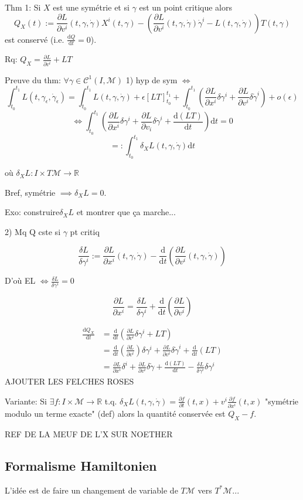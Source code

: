 \documentclass[a4paper,11pt]{article}
\renewcommand{\d}{{\mathrm{d}}}
\newcommand{\dr}[2]{\frac{\partial {#1}}{\partial{#2}}}
\begin{document}
Thm 1: Si $X$ est une symétrie et si $\gamma$ est un point critique alors
$$Q_X(t) := \dr{L}{v^i}(t,\gamma,\dot\gamma)X^i(t,\gamma) - \left(\dr{L}{v^i}(t,\gamma,\dot\gamma)\dot\gamma^i - L(t,\gamma,\dot\gamma)\right)T(t,\gamma)$$
est conservé (i.e. $\frac{\d Q}{\d t}=0$).

Rq: $Q_X = \dr{L}{v^i} + LT$

Preuve du thm:
$\forall \gamma \in \mathcal{C}^1(I,\mathcal{M})$
1) hyp de sym $\iff$
$$\int_{t_0}^{t_1} L(t,\gamma_\epsilon,\dot\gamma_\epsilon) = \int_{t_0}^{t_1}L(t,\gamma,\dot\gamma) + \epsilon [LT]_{t_0}^{t_1} + \int_{t_0}^{t_1} (\dr{L}{x^i}\delta \gamma^i + \dr{L}{v^i}\delta\dot\gamma^i) +o(\epsilon)$$
$$\iff \int_{t_0}^{t_1} (\dr{L}{x^i}\delta \gamma^i + \dr{L}{v_i}\delta\dot \gamma^i + \frac{\d (LT)}{\d t})\d t =0$$
$$=: \int_{t_0}^{t_1} \delta_X L(t,\gamma,\dot\gamma) \d t$$

où $\delta_X L : I\times T\mathcal{M} \to \mathbb{R}$

Bref, symétrie $\implies \delta_X L = 0$.

Exo: construire$ \delta_X L$ et montrer que ça marche...

2) Mq Q cste si $\gamma$ pt critiq

$$\frac{\delta L}{\delta \gamma^i} := \dr{L}{x^i}(t,\gamma,\dot\gamma) - \frac{\d}{\d t}(\dr{L}{v^i}(t,\gamma,\dot\gamma))$$

D'où EL $\iff \frac{\delta L}{\delta \gamma^i}=0$

$$\dr{L}{x^i}= \frac{\delta L}{\delta \gamma^i} + \frac{\d}{\d t}(\dr{L}{v^i})$$

\begin{align*}
\frac{\d Q_X}{\d t}
&= \frac{\d}{\d t} (\dr{L}{v^i}\delta \gamma^i + LT)\\
&= \frac{\d}{\d t} (\dr{L}{v^i})\delta \gamma^i + \dr{L}{v^i} \delta\dot\gamma^i+\frac{\d}{\d t}(LT)\\
&= \dr{L}{x^i} \delta^i+\dr{L}{v^i}\delta \dot \gamma + \frac{\d (LT)}{\d t} - \frac{\delta L}{\delta \gamma^i}\delta \gamma^i
\end{align*}
AJOUTER LES FELCHES ROSES

Variante: Si $\exists f:I\times\mathcal{M}\to \mathbb{R}$ t.q. $\delta_X L(t,\gamma,\dot\gamma) = \frac{\partial f}{\partial t}(t,x) + v^i \frac{\partial f}{\partial x^i}(t,x)$ "symétrie modulo un terme exacte" (def) alors la quantité conservée est $Q_X -f$.

REF DE LA MEUF DE L'X SUR NOETHER

\subsection{Formalisme Hamiltonien}
L'idée est de faire un changement de variable de $T\mathcal{M}$ vers $T^*\mathcal{M}$...
\end{document}

